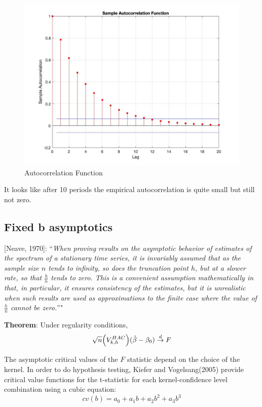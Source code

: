 \documentclass[12pt,]{book}
\begin{document}
\begin{figure}
\centering
\includegraphics{figures/Fig_331.jpg}
\caption{Autocorrelation Function}
\end{figure}

It looks like after 10 periods the empirical autocorrelation is quite small but still not zero.

\hypertarget{fixed-b-asymptotics}{%
\subsection{Fixed b asymptotics}\label{fixed-b-asymptotics}}

{[}Neave, 1970{]}: ``\emph{When proving results on the asymptotic behavior of estimates of the spectrum of a stationary time series, it is invariably assumed that as the sample size \(n\) tends to infinity, so does the truncation point \(h\), but at a slower rate, so that \(\frac{h}{n}\) tends to zero. This is a convenient assumption mathematically in that, in particular, it ensures consistency of the estimates, but it is unrealistic when such results are used as approximations to the finite case where the value of \(\frac{h}{n}\) cannot be zero.}''"

\textbf{Theorem}:
Under regularity conditions,
\[
    \sqrt{n} \Big( V^{HAC} _ {k,h} \Big)(\hat \beta - \beta_0) \overset{d}{\to} F \\
\]

The asymptotic critical values of the \(F\) statistic depend on the choice of the kernel. In order to do hypothesis testing, Kiefer and Vogelsang(2005) provide critical value functions for the t-statistic for each kernel-confidence level combination using a cubic equation:
\[
    cv(b) = a_0 + a_1 b + a_2 b^2 + a_3 b^3
\]
\end{document}
